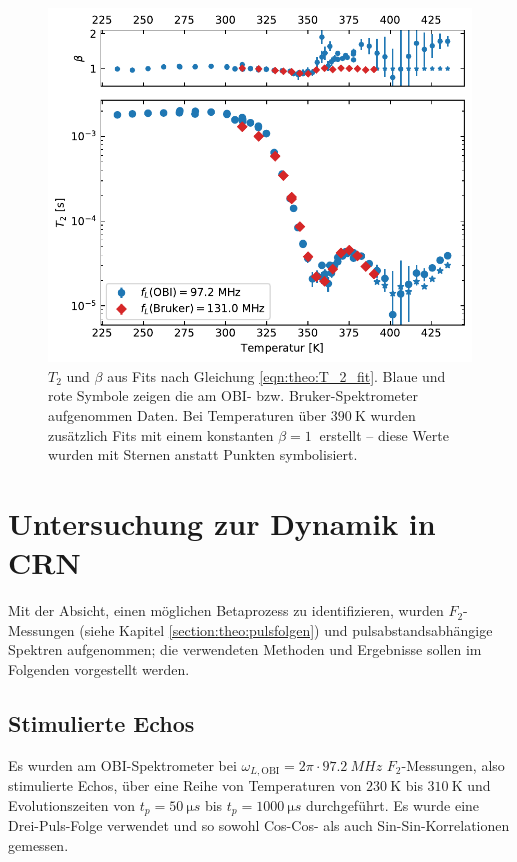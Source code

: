 \begin{figure}
	\begin{center}
		\includegraphics[width=.9\textwidth]{graphics/plot/t2.pdf}
	\end{center}
	\caption{$T_2$ und $\beta$ aus Fits nach Gleichung \eqref{eqn:theo:T_2_fit}. Blaue und rote Symbole zeigen die am OBI- bzw. Bruker-Spektrometer aufgenommen Daten. Bei Temperaturen über $\SI{390}{\kelvin}$ wurden zusätzlich Fits mit einem konstanten $\beta = \SI{1}{}$ erstellt -- diese Werte wurden mit Sternen anstatt Punkten symbolisiert.} \label{fig:res:T_2}
\end{figure}



\section{Untersuchung zur Dynamik in CRN} \label{section:res:F_2}

Mit der Absicht, einen möglichen Betaprozess zu identifizieren, wurden $F_2$-Messungen (siehe Kapitel \ref{section:theo:pulsfolgen}) und pulsabstandsabhängige Spektren aufgenommen; die verwendeten Methoden und Ergebnisse sollen im Folgenden vorgestellt werden.

\subsection{Stimulierte Echos} \label{section:res:stimechos}

Es wurden am OBI-Spektrometer bei $\omega_{L, \text{OBI}} = 2\pi \cdot \SI{97.2}{MHz}$ $F_2$-Messungen, also stimulierte Echos, über eine Reihe von Temperaturen von $\SI{230}{\kelvin}$ bis $\SI{310}{\kelvin}$ und Evolutionszeiten von $t_p = \SI{50}{\micro s}$ bis $t_p = \SI{1000}{\micro s}$ durchgeführt. Es wurde eine Drei-Puls-Folge verwendet und so sowohl Cos-Cos- als auch Sin-Sin-Korrelationen gemessen.

